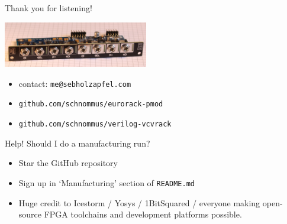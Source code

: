 \documentclass[aspectratio=169]{beamer}
\begin{document}
\begin{frame}{Thank you for listening!}

    \begin{center}
        \includegraphics[height=2cm]{img/eurorack-pmod.jpg}
    \end{center}

    \begin{itemize}
        \item contact: \texttt{me@sebholzapfel.com}
        \item \texttt{github.com/schnommus/eurorack-pmod}
        \item \texttt{github.com/schnommus/verilog-vcvrack}
    \end{itemize}

    \begin{block}{Help! Should I do a manufacturing run?}
        \begin{itemize}
            \item Star the GitHub repository
            \item Sign up in `Manufacturing' section of \texttt{README.md}
        \end{itemize}
    \end{block}

    \begin{itemize}
        \item Huge credit to Icestorm / Yosys / 1BitSquared / everyone making open-source FPGA toolchains and development platforms possible.
    \end{itemize}

\end{frame}
\end{document}
